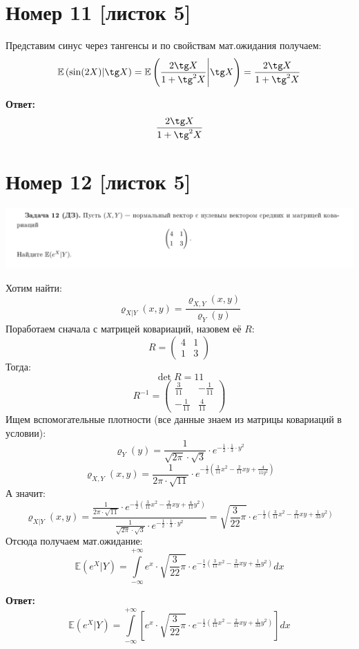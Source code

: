 \documentclass[a4paper,12pt]{article}
\author{Бурмашев Григорий, БПМИ-208}
\title{}
\date{\today}
\begin{document}
\maketitle
 \section*{Номер 11 [листок 5]}
Представим синус через тангенсы и по свойствам мат.ожидания получаем:
\[
\mathbb{E} \left(
\sin (2X) | \tg X 
\right) = \mathbb{E} \left(
\frac{2 \tg X}{1 + \tg^2 X} \Bigg| \tg X 
\right)  = \frac{2 \tg X}{1 + \tg^2 X} 
\]
\begin{center}
\textbf{Ответ: } 
\[
\frac{2 \tg X}{1 + \tg^2 X} 
\]
\end{center}
 \section*{Номер 12 [листок 5]}
\begin{center}
\includegraphics[scale=0.3]{1.png}
\end{center}
Хотим найти:
\[
\varrho_{X | Y} (x, y) = \frac{\varrho_{X, Y} (x, y)}{\varrho_Y(y)}
\]
Поработаем сначала с матрицей ковариаций, назовем её $R$:
\[
R = \begin{pmatrix}
4 & 1 \\ 1 & 3 
\end{pmatrix}
\]
Тогда:
\[
\det R = 11
\]
\[
R^{-1} = \left(\begin{matrix}
\frac{3}{11} & -\frac{1}{11} \\
-\frac{1}{11} & \frac{4}{11}
\end{matrix}\right)
\]
Ищем вспомогательные плотности (все данные знаем из матрицы ковариаций в условии):
\[
\varrho_Y(y) = \frac{1}{\sqrt{2\pi} \cdot \sqrt{3}} \cdot e^{-\frac12 \cdot \frac{1}{3} \cdot y^2}
\]
\[
\varrho_{X, Y} (x, y) = \frac{1}{2\pi \cdot \sqrt{11} } \cdot e^{-\frac{1}{2} \left(
\frac{3}{11} x^2 - \frac{2}{11}xy + \frac{4}{11y^2}
\right)}
\]
А значит:
\[
\varrho_{X | Y} (x, y)  = \frac{\frac{1}{2\pi \cdot \sqrt{11} } \cdot e^{-\frac{1}{2} \left(
\frac{3}{11} x^2 - \frac{2}{11}xy + \frac{4}{11}y^2
\right)}}{\frac{1}{\sqrt{2\pi} \cdot \sqrt{3}} \cdot e^{-\frac12 \cdot \frac{1}{3} \cdot y^2}} = \sqrt{\frac{3}{22}\pi } \cdot e^{-\frac{1}{2} \left(
\frac{3}{11} x^2 - \frac{2}{11}xy + \frac{1}{33}y^2 
\right)}
\]
Отсюда получаем мат.ожидание:
\[
\mathbb{E} (e^X | Y) = \int\limits_{-\infty}^{+\infty} e^x \cdot \sqrt{\frac{3}{22}\pi } \cdot e^{-\frac{1}{2} \left(
\frac{3}{11} x^2 - \frac{2}{11}xy + \frac{1}{33}y^2 
\right)} dx 
\]
\begin{center}
\textbf{Ответ: } 
\[
\mathbb{E} (e^X | Y) = \int\limits_{-\infty}^{+\infty} \left[ 
 e^x \cdot \sqrt{\frac{3}{22}\pi } \cdot e^{-\frac{1}{2} \left(
\frac{3}{11} x^2 - \frac{2}{11}xy + \frac{1}{33}y^2 
\right)} 
\right] 
dx 
\]
\end{center}
\end{document}
